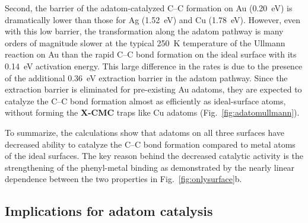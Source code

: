 \documentclass[aps,prb,amsmath,amssymb,11pt]{revtex4-1}
\begin{document}
Second, the barrier of the adatom-catalyzed C--C formation on Au (\SI{0.20}{\electronvolt}) is dramatically lower than those for Ag (\SI{1.52}{\electronvolt}) and Cu (\SI{1.78}{\electronvolt}). 
However, even with this low barrier, the transformation along the adatom pathway is many orders of magnitude slower at the typical \SI{250}{\kelvin} temperature of the Ullmann reaction on Au than the rapid C--C bond formation on the ideal surface with its \SI{0.14}{\electronvolt} activation energy. This large difference in the rates is due to the presence of the additional \SI{0.36}{\electronvolt} extraction barrier in the adatom pathway. 
%
Since the extraction barrier is eliminated for pre-existing Au adatoms, they are expected to catalyze the C--C bond formation almost as efficiently as ideal-surface atoms, without forming the \textbf{X-CMC} traps like Cu adatoms (Fig.~\ref{fig:adatomullmann}).

To summarize, the calculations show that adatoms on all three surfaces have decreased ability to catalyze the C--C bond formation compared to metal atoms of the ideal surfaces. 
The key reason behind the decreased catalytic activity is the strengthening of the phenyl-metal binding as demonstrated by the nearly linear dependence between the two properties in Fig.~\ref{fig:onlysurface}b.



\ifdefined\INTERNAL
\subsection{Implications for adatom catalysis}
\fi
\end{document}

